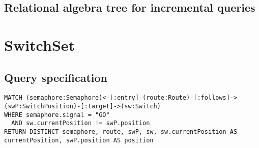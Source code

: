 \subsection*{Relational algebra tree for incremental queries}

\section{SwitchSet}

\subsection*{Query specification}

\begin{lstlisting}
MATCH (semaphore:Semaphore)<-[:entry]-(route:Route)-[:follows]->(swP:SwitchPosition)-[:target]->(sw:Switch)
WHERE semaphore.signal = "GO"
  AND sw.currentPosition != swP.position
RETURN DISTINCT semaphore, route, swP, sw, sw.currentPosition AS currentPosition, swP.position AS position
\end{lstlisting}

